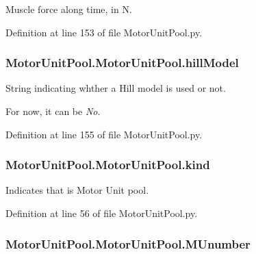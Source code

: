 Muscle force along time, in N. 



Definition at line 153 of file Motor\+Unit\+Pool.\+py.

\subsubsection[{\texorpdfstring{hill\+Model}{hillModel}}]{\setlength{\rightskip}{0pt plus 5cm}Motor\+Unit\+Pool.\+Motor\+Unit\+Pool.\+hill\+Model}\hypertarget{class_motor_unit_pool_1_1_motor_unit_pool_a963061fdcfee8f9dc33e4d6f130ea59b}{}\label{class_motor_unit_pool_1_1_motor_unit_pool_a963061fdcfee8f9dc33e4d6f130ea59b}


String indicating whther a Hill model is used or not. 

For now, it can be {\itshape No}. 

Definition at line 155 of file Motor\+Unit\+Pool.\+py.

\subsubsection[{\texorpdfstring{kind}{kind}}]{\setlength{\rightskip}{0pt plus 5cm}Motor\+Unit\+Pool.\+Motor\+Unit\+Pool.\+kind}\hypertarget{class_motor_unit_pool_1_1_motor_unit_pool_aeb57d0463ad56a16b166d00dc6079b95}{}\label{class_motor_unit_pool_1_1_motor_unit_pool_aeb57d0463ad56a16b166d00dc6079b95}


Indicates that is Motor Unit pool. 



Definition at line 56 of file Motor\+Unit\+Pool.\+py.

\subsubsection[{\texorpdfstring{M\+Unumber}{MUnumber}}]{\setlength{\rightskip}{0pt plus 5cm}Motor\+Unit\+Pool.\+Motor\+Unit\+Pool.\+M\+Unumber}\hypertarget{class_motor_unit_pool_1_1_motor_unit_pool_aa5884530baaa20f46007805bc574407d}{}\label{class_motor_unit_pool_1_1_motor_unit_pool_aa5884530baaa20f46007805bc574407d}



